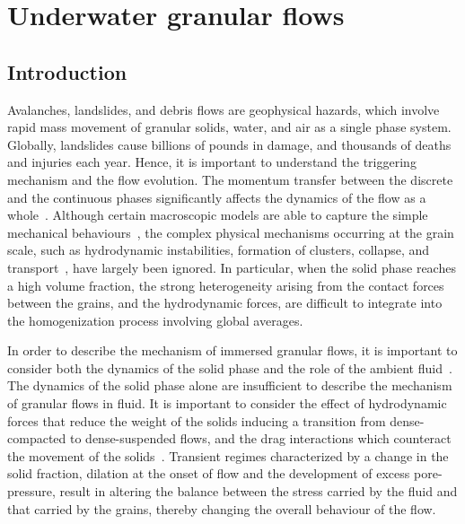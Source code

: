 \chapter{Underwater granular flows}

\ifpdf
    \graphicspath{{Chapter6/figs/raster/}{Chapter6/figs/pdf/}{Chapter6/figs/}}
\else
    \graphicspath{{Chapter6/figs/vector/}{Chapter6/figs/}}
\fi

\section{Introduction}
Avalanches, landslides, and debris flows are geophysical hazards, which involve 
rapid mass movement of granular solids, water, and air as a single phase 
system. Globally, landslides cause billions of pounds in damage, and thousands 
of deaths and injuries each year. Hence, it is important to understand the 
triggering mechanism and the flow evolution. The momentum transfer between the 
discrete and the continuous phases significantly affects the dynamics of the 
flow as a whole~\citep{Topin2012}. Although certain macroscopic models are able 
to capture the simple mechanical behaviours~\citep{Peker2007}, the complex 
physical mechanisms occurring at the grain scale, such as hydrodynamic 
instabilities, formation of clusters, collapse, and 
transport~\citep{Topin2011}, have largely been ignored. In particular, when the 
solid phase reaches a high volume fraction, the strong heterogeneity arising 
from the contact forces between the grains, and the hydrodynamic forces, are 
difficult to integrate into the homogenization process involving global 
averages. 

In order to describe the mechanism of immersed 
granular flows, it is important to consider both the dynamics of the solid 
phase and the role of the ambient fluid~\citep{Denlinger2001}. The dynamics of 
the solid phase alone are insufficient to describe the mechanism of granular 
flows in fluid. It is important to consider the effect of hydrodynamic forces 
that reduce the weight of the solids inducing a transition from dense-compacted 
to dense-suspended flows, and the drag interactions which counteract the 
movement of the solids~\citep{Meruane2010}. Transient regimes characterized by 
a change in the solid fraction, dilation at the onset of flow and the 
development of excess pore-pressure, result in altering the balance between the 
stress carried by the fluid and that carried by the grains, thereby changing 
the overall behaviour of the flow. 

